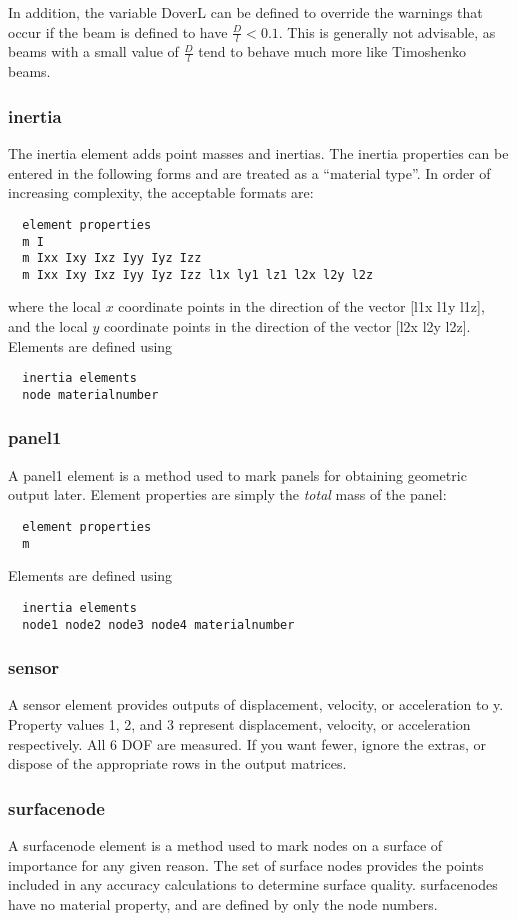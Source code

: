 \documentclass[12pt]{article}
\newcommand*{\command}[1]{\textsf{#1}}
\begin{document}
In addition, the variable \command{DoverL} can be defined to override the warnings that occur if the beam is defined to have  $\frac{D}{l}<0.1$. This is generally not advisable, as beams with a small value of $\frac{D}{l}$ tend to behave much more like Timoshenko beams.



\subsubsection{\command{inertia}}\label{el:inertia}
The \command{inertia} element adds point masses and inertias.  The inertia properties can be entered in the following forms and are treated as a ``material type''.  In order of increasing complexity, the acceptable formats are:
\begin{lstlisting}
  element properties
  m I
  m Ixx Ixy Ixz Iyy Iyz Izz
  m Ixx Ixy Ixz Iyy Iyz Izz l1x ly1 lz1 l2x l2y l2z
\end{lstlisting}
where the local $x$ coordinate points in the direction of the vector
[l1x l1y l1z], and the local $y$ coordinate points in the direction of
the vector [l2x l2y l2z]. Elements are defined using
\begin{lstlisting}
  inertia elements
  node materialnumber
\end{lstlisting}
\subsubsection{\command{panel1}}
A \command{panel1} element is a method used to mark panels for obtaining geometric output later. Element properties are simply the \emph{total} mass of the panel:
\begin{lstlisting}
  element properties
  m
\end{lstlisting}
Elements are defined using
\begin{lstlisting}
  inertia elements
  node1 node2 node3 node4 materialnumber
\end{lstlisting}
\subsubsection{\command{sensor}}
A \command{sensor} element provides outputs of displacement, velocity, or acceleration to \command{y}. Property values 1, 2, and 3 represent displacement, velocity, or acceleration respectively. All 6 DOF are measured. If you want fewer, ignore the extras, or dispose of the appropriate rows in the output matrices.
\subsubsection{\command{surfacenode}}
A \command{surfacenode} element is a method used to mark nodes on a surface of importance for any given reason. The set of surface nodes provides the points included in any accuracy calculations to determine surface quality. \command{surfacenodes} have no material property, and are defined by only the node numbers.
\end{document}

